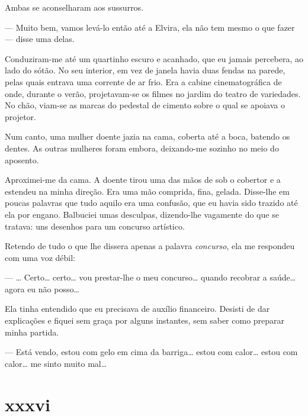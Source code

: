 
Ambas se aconselharam aos sussurros.

--- Muito bem, vamos levá-lo então até a Elvira, ela não tem mesmo o que
    fazer --- disse uma delas.

Conduziram-me até um quartinho escuro e acanhado, que eu jamais percebera, ao
lado do sótão. No seu interior, em vez de janela havia duas fendas na parede,
pelas quais entrava uma corrente de ar frio. Era a cabine cinematográfica de
onde, durante o verão, projetavam-se os filmes no jardim do teatro de
variedades. No chão, viam-se as marcas do pedestal de cimento sobre o qual se
apoiava o projetor.

Num canto, uma mulher doente jazia na cama, coberta até a boca, batendo os
dentes. As outras mulheres foram embora, deixando-me sozinho no meio do
aposento.

Aproximei-me da cama. A doente tirou uma das mãos de sob o cobertor e a
estendeu na minha direção. Era uma mão comprida, fina, gelada. Disse-lhe em
poucas palavras que tudo aquilo era uma confusão, que eu havia sido trazido
até ela por engano. Balbuciei umas desculpas, dizendo-lhe vagamente do que se
tratava: uns desenhos para um concurso artístico.

Retendo de tudo o que lhe dissera apenas a palavra \textit{concurso}, ela me
respondeu com uma voz débil:

--- \ldots{} Certo\ldots{} certo\ldots{} vou prestar-lhe o meu concurso\ldots
     {} quando recobrar a saúde\ldots{} agora eu não posso\ldots{}

Ela tinha entendido que eu precisava de auxílio financeiro. Desisti de dar
explicações e fiquei sem graça por alguns instantes, sem saber como preparar
minha partida.


--- Está vendo, estou com gelo em cima da barriga\ldots{} estou com
    calor\ldots{} estou com calor\ldots{} me sinto muito mal\ldots{}



\section{xxxvi} 

